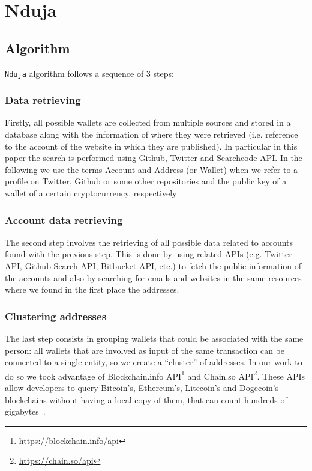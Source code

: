 \newcommand{\walletcollector}{\texttt{wallet\_collector}}
\newcommand{\userinforetriever}{\texttt{user\_info\_retriever}}
\newcommand{\addresschecker}{\texttt{address\_checker}}
\newcommand{\graph}{\texttt{graph}}

\section{Nduja} \label{nduja}

\subsection{Algorithm}
\texttt{Nduja} algorithm follows a sequence of 3 steps:
\subsubsection*{Data retrieving} Firstly, all possible wallets are collected
from multiple sources and stored in a database along with the
information of where they were retrieved (i.e. reference to the account of the
website in which they are published). In particular in this paper the search is
performed using Github, Twitter and Searchcode API. In the following we use the
terms Account and Address (or Wallet) when we refer to a profile on Twitter,
Github or some other repositories and the public key of a wallet of a certain
cryptocurrency, respectively

\subsubsection*{Account data retrieving} The second step involves the
retrieving of all possible data related to accounts found with the previous
step. This is done by using related APIs (e.g. Twitter API, Github Search API,
Bitbucket API, etc.) to fetch the public information of the accounts and also
by searching for emails and websites in the same resources where we found in
the first place the addresses.

\subsubsection*{Clustering addresses} The last step consists in grouping
wallets that could be associated with the same person: all wallets that are
involved as input of the same transaction can be connected to a single
entity, so we create a ``cluster'' of addresses. In our work to do so we
took advantage of
Blockchain.info API\footnote{\url{https://blockchain.info/api}} and
Chain.so API\footnote{\url{https://chain.so/api}}. These APIs allow
developers to query Bitcoin's, Ethereum's, Litecoin's and Dogecoin's
blockchains without having a local copy of them, that can count
hundreds of gigabytes~\cite{bib:bitinfochart}.

